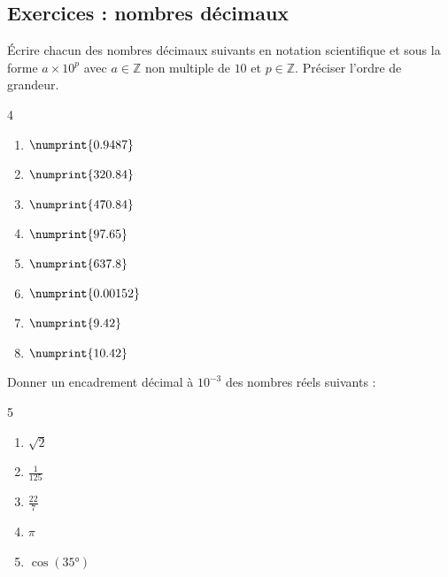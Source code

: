 %	 

\newpage 
{}  
\pagestyle{scrheadings} %
\onehalfspacing
\subsection{Exercices : nombres décimaux}
\begin{exercise} Écrire chacun des nombres décimaux suivants en notation scientifique et sous la forme $a\times 10^p$  avec $a\in\mathbb{Z}$ non multiple de $10$ et $p\in\mathbb{Z}$. Préciser l'ordre de grandeur.
	\begin{multicols}{4} 
		\begin{enumerate}[label={\alph*)\rule{0pt}{1.8em}},leftmargin=*]
			\item $\numprint{0.9487}$
			\item $\numprint{320.84}$
			\item $\numprint{470.84}$
			\item $\numprint{97.65}$
			\item $\numprint{637.8}$
			\item $\numprint{0.00152}$
			\item $\numprint{9.42}$
			\item $\numprint{10.42}$
		\end{enumerate}
	\end{multicols}  
\end{exercise}
\begin{exercise}Donner un encadrement décimal à $10^{-3}$ des nombres réels suivants :
	\begin{multicols}{5} 
		\begin{enumerate}[label={\alph*)\rule{0pt}{1.8em}},leftmargin=*]
			\item $\sqrt{2}$
			\item $\frac{1}{125}$
			\item $\frac{22}{7}$
			\item $\pi$
			\item $\cos(\ang{35})$ 
		\end{enumerate}
	\end{multicols}  
\end{exercise}
